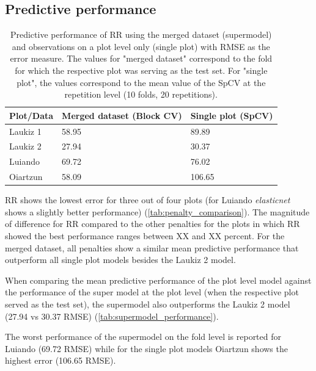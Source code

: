 \documentclass[review]{elsarticle}
\begin{document}
\subsection{Predictive performance}

\begin{table}[t!]
\centering
\caption[t]{Predictive performance of \ac{RR} using the merged dataset (supermodel) and observations on a plot level only (single plot) with \ac{RMSE} as the error measure. The values for "merged dataset" correspond to the fold for which the respective plot was serving as the test set. For "single plot", the values correspond to the mean value of the SpCV at the repetition level (10 folds, 20 repetitions).}
\begingroup\footnotesize
\begin{tabular}{lll}
	\\
	Plot/Data & Merged dataset (Block CV) & Single plot (SpCV) \\
	\hline
	Laukiz 1  & 58.95                     & 89.89              \\
	Laukiz 2  & 27.94                     & 30.37              \\
	Luiando   & 69.72                     & 76.02              \\
	Oiartzun  & 58.09                     & 106.65             \\
	\bottomrule
\end{tabular}
\endgroup
\label{tab:supermodel_performance}
\end{table}

\ac{RR} shows the lowest error for three out of four plots (for Luiando \textit{elasticnet} shows a slightly better performance) (\autoref{tab:penalty_comparison}).
The magnitude of difference for \ac{RR} compared to the other penalties for the plots in which \ac{RR} showed the best performance ranges between XX and XX percent.
For the merged dataset, all penalties show a similar mean predictive performance that outperform all single plot models besides the Laukiz 2 model.

When comparing the mean predictive performance of the plot level model against the performance of the super model at the plot level (when the respective plot served as the test set), the supermodel also outperforms the Laukiz 2 model (27.94 vs 30.37 RMSE) (\autoref{tab:supermodel_performance}).

The worst performance of the supermodel on the fold level is reported for Luiando (69.72 RMSE) while for the single plot models Oiartzun shows the highest error (106.65 RMSE).
\end{document}
